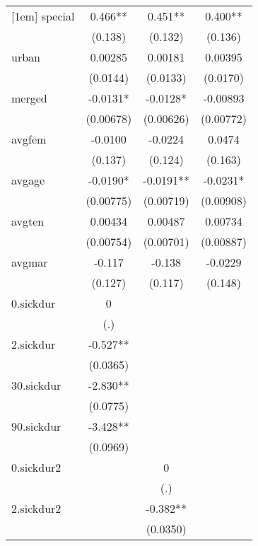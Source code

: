 \begin{table}[htbp]
\begin{tabular}{l*{3}{c}}
[1em]
special     &       0.466**&       0.451**&       0.400**\\
            &     (0.138)  &     (0.132)  &     (0.136)  \\
[1em]
urban       &     0.00285  &     0.00181  &     0.00395  \\
            &    (0.0144)  &    (0.0133)  &    (0.0170)  \\
[1em]
merged      &     -0.0131* &     -0.0128* &    -0.00893  \\
            &   (0.00678)  &   (0.00626)  &   (0.00772)  \\
[1em]
avgfem      &     -0.0100  &     -0.0224  &      0.0474  \\
            &     (0.137)  &     (0.124)  &     (0.163)  \\
[1em]
avgage      &     -0.0190* &     -0.0191**&     -0.0231* \\
            &   (0.00775)  &   (0.00719)  &   (0.00908)  \\
[1em]
avgten      &     0.00434  &     0.00487  &     0.00734  \\
            &   (0.00754)  &   (0.00701)  &   (0.00887)  \\
[1em]
avgmar      &      -0.117  &      -0.138  &     -0.0229  \\
            &     (0.127)  &     (0.117)  &     (0.148)  \\
[1em]
0.sickdur   &           0  &              &              \\
            &         (.)  &              &              \\
[1em]
2.sickdur   &      -0.527**&              &              \\
            &    (0.0365)  &              &              \\
[1em]
30.sickdur  &      -2.830**&              &              \\
            &    (0.0775)  &              &              \\
[1em]
90.sickdur  &      -3.428**&              &              \\
            &    (0.0969)  &              &              \\
[1em]
0.sickdur2  &              &           0  &              \\
            &              &         (.)  &              \\
[1em]
2.sickdur2  &              &      -0.382**&              \\
            &              &    (0.0350)  &              \\

\end{tabular}
\end{table}
